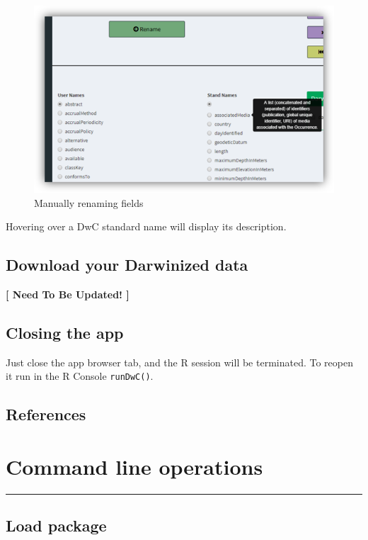 \documentclass[]{book}
\theoremstyle{definition}
\theoremstyle{definition}
\theoremstyle{definition}
\theoremstyle{remark}
\begin{document}
\begin{figure}
\centering
\includegraphics{img/bdDwC_Manual_rename.png}
\caption{Manually renaming fields}
\end{figure}

Hovering over a DwC standard name will display its description.

\section{Download your Darwinized
data}\label{download-your-darwinized-data}

\textbf{{{[} Need To Be Updated! {]}}}

\section{Closing the app}\label{closing-the-app}

Just close the app browser tab, and the R session will be terminated. To
reopen it run in the R Console \texttt{runDwC()}.

\section{References}\label{references}

\chapter{Command line operations}\label{command-line-operations}

\begin{center}\rule{0.5\linewidth}{\linethickness}\end{center}

\section{Load package}\label{load-package}
\end{document}
